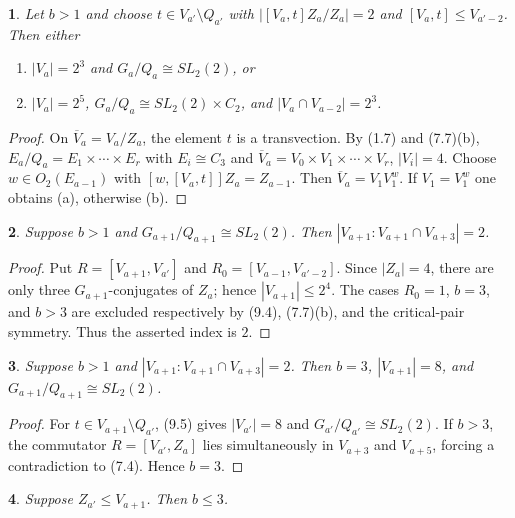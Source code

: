 \documentclass[11pt]{article}
\theoremstyle{plain}
\theoremstyle{stmplain}
\newtheorem{stm}{}[section]
\begin{document}
\begin{stm}\label{st:9.5}
Let $b>1$ and choose $t\in V_{a'}\setminus Q_{a'}$ with
$|[V_a,t]Z_a/Z_a|=2$ and $[V_a,t]\le V_{a'-2}$. Then either
\begin{enumerate}
\item[(a)] $|V_a|=2^3$ and $G_a/Q_a\cong SL_2(2)$, or
\item[(b)] $|V_a|=2^5$, $G_a/Q_a\cong SL_2(2)\times C_2$, and
  $|V_a\cap V_{a-2}|=2^3$.
\end{enumerate}
\end{stm}

\begin{proof}
On $\overline V_a=V_a/Z_a$, the element $t$ is a transvection. By
(1.7) and (7.7)(b), $E_a/Q_a=E_1\times\cdots\times E_r$ with
$E_i\cong C_3$ and $\overline V_a=V_0\times V_1\times\cdots\times V_r$,
$|V_i|=4$. Choose $w\in O_2(E_{a-1})$ with
$[w,[V_a,t]]Z_a=Z_{a-1}$. Then $\overline V_a=V_1V_1^w$.
If $V_1=V_1^w$ one obtains (a), otherwise (b).
\end{proof}

\begin{stm}\label{st:9.6}
Suppose $b>1$ and $G_{a+1}/Q_{a+1}\cong SL_2(2)$. Then
$|V_{a+1}:V_{a+1}\cap V_{a+3}|=2$.
\end{stm}

\begin{proof}
Put $R=[V_{a+1},V_{a'}]$ and
$R_0=[V_{a-1},V_{a'-2}]$. Since $|Z_a|=4$, there are only three
$G_{a+1}$-conjugates of $Z_a$; hence $|V_{a+1}|\le2^4$. The cases
$R_0=1$, $b=3$, and $b>3$ are excluded respectively by (9.4),
(7.7)(b), and the critical-pair symmetry. Thus the asserted index is $2$.
\end{proof}

\begin{stm}\label{st:9.7}
Suppose $b>1$ and
$|V_{a+1}:V_{a+1}\cap V_{a+3}|=2$. Then $b=3$,
$|V_{a+1}|=8$, and $G_{a+1}/Q_{a+1}\cong SL_2(2)$.
\end{stm}

\begin{proof}
For $t\in V_{a+1}\setminus Q_{a'}$, (9.5) gives
$|V_{a'}|=8$ and $G_{a'}/Q_{a'}\cong SL_2(2)$. If $b>3$, the
commutator $R=[V_{a'},Z_a]$ lies simultaneously in
$V_{a+3}$ and $V_{a+5}$, forcing a contradiction to (7.4). Hence
$b=3$.
\end{proof}

\begin{stm}\label{st:9.8}
Suppose $Z_{a'}\le V_{a+1}$. Then $b\le3$.
\end{stm}
\end{document}
